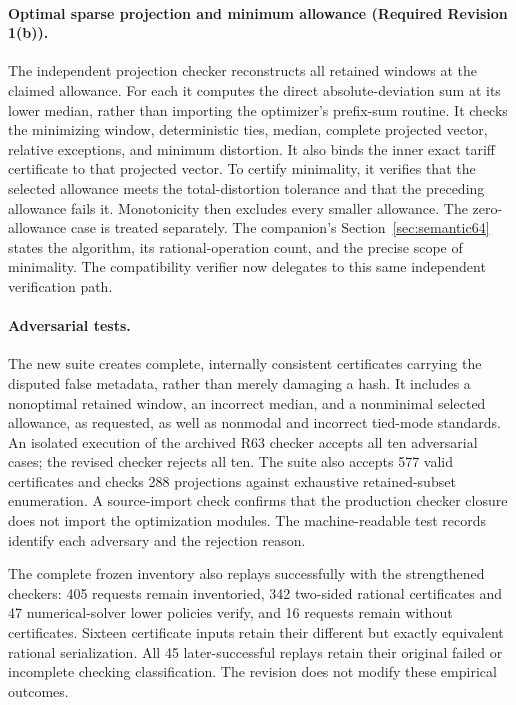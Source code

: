 \paragraph{Optimal sparse projection and minimum allowance (Required Revision 1(b)).}
The independent projection checker reconstructs all retained windows at the claimed allowance. For each it computes the direct absolute-deviation sum at its lower median, rather than importing the optimizer's prefix-sum routine. It checks the minimizing window, deterministic ties, median, complete projected vector, relative exceptions, and minimum distortion. It also binds the inner exact tariff certificate to that projected vector. To certify minimality, it verifies that the selected allowance meets the total-distortion tolerance and that the preceding allowance fails it. Monotonicity then excludes every smaller allowance. The zero-allowance case is treated separately. The companion's Section~\ref{sec:semantic64} states the algorithm, its rational-operation count, and the precise scope of minimality. The compatibility verifier now delegates to this same independent verification path.

\paragraph{Adversarial tests.}
The new suite creates complete, internally consistent certificates carrying the disputed false metadata, rather than merely damaging a hash. It includes a nonoptimal retained window, an incorrect median, and a nonminimal selected allowance, as requested, as well as nonmodal and incorrect tied-mode standards. An isolated execution of the archived R63 checker accepts all ten adversarial cases; the revised checker rejects all ten. The suite also accepts 577 valid certificates and checks 288 projections against exhaustive retained-subset enumeration. A source-import check confirms that the production checker closure does not import the optimization modules. The machine-readable test records identify each adversary and the rejection reason.

The complete frozen inventory also replays successfully with the strengthened checkers: 405 requests remain inventoried, 342 two-sided rational certificates and 47 numerical-solver lower policies verify, and 16 requests remain without certificates. Sixteen certificate inputs retain their different but exactly equivalent rational serialization. All 45 later-successful replays retain their original failed or incomplete checking classification. The revision does not modify these empirical outcomes.

